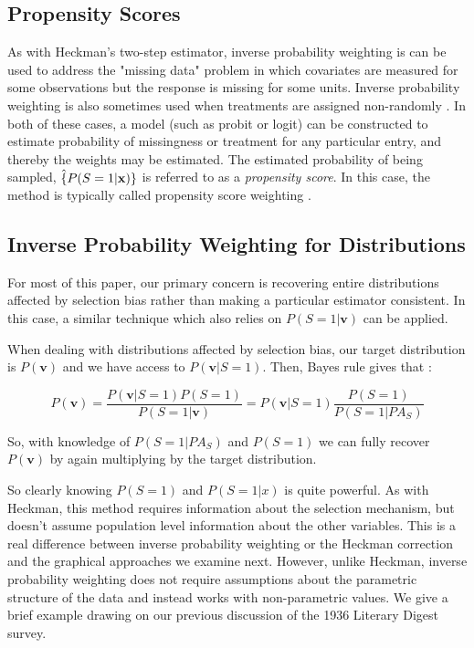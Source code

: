\documentclass[12pt,twoside]{reedthesis}
\theoremstyle{definition}
\begin{document}
\subsection{Propensity Scores}

As with Heckman's two-step estimator, inverse probability weighting is can be used to address the "missing data" problem in which covariates are measured for some observations but the response is missing for some units. Inverse probability weighting is also sometimes used when treatments are assigned non-randomly \citep{Haneuse_2009}.  In both of these cases, a model (such as probit or logit) can be constructed to estimate probability of missingness or treatment for any particular entry, and thereby the weights may be estimated. The estimated probability of being sampled, $\hat\{P(S = 1 | \mathbf{x})\}$ is referred to as a \emph{propensity score}. In this case, the method is typically called propensity score weighting \citep{Bishop_2018}. 


\subsection{Inverse Probability Weighting for Distributions}

For most of this paper, our primary concern is recovering entire distributions affected by selection bias rather than making a particular estimator consistent. In this case, a similar technique which also relies on $P(S=1 | \mathbf{v})$ can be applied. 

When dealing with distributions affected by selection bias, our target distribution is $P(\mathbf{v})$ and we have access to $P(\mathbf{v} | S = 1)$. Then, Bayes rule gives that \citep{Cortes_2008}:

$$P(\mathbf{v}) = \frac{P(\mathbf{v}  | S = 1)P(S = 1)}{P(S=1 | \mathbf{v})} = P(\mathbf{v}  | S = 1) \frac{P(S = 1)}{P(S=1 | PA_{S})}$$

So, with knowledge of $P(S=1 | PA_S)$ and $P(S = 1)$ we can fully recover $P(\mathbf{v})$ by again multiplying by the target distribution. 


So clearly knowing $P(S = 1)$ and $P(S = 1|x)$ is quite powerful. As with Heckman, this method requires information about the selection mechanism, but doesn't assume population level information about the other variables. This is a real difference between inverse probability weighting or the Heckman correction and the graphical approaches we examine next. However, unlike Heckman, inverse probability weighting does not require  assumptions about the parametric structure of the data and instead works with non-parametric values.   We give a brief example drawing on our previous discussion of the 1936 Literary Digest survey.
\end{document}
